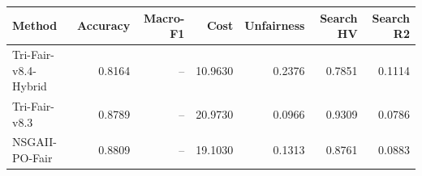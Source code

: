 \begin{tabular}{lrrrrrr}
\hline
Method & Accuracy & Macro-F1 & Cost & Unfairness & Search HV & Search R2 \\
\hline
Tri-Fair-v8.4-Hybrid & 0.8164 & -- & 10.9630 & 0.2376 & 0.7851 & 0.1114 \\
Tri-Fair-v8.3 & 0.8789 & -- & 20.9730 & 0.0966 & 0.9309 & 0.0786 \\
NSGAII-PO-Fair & 0.8809 & -- & 19.1030 & 0.1313 & 0.8761 & 0.0883 \\
\hline
\end{tabular}